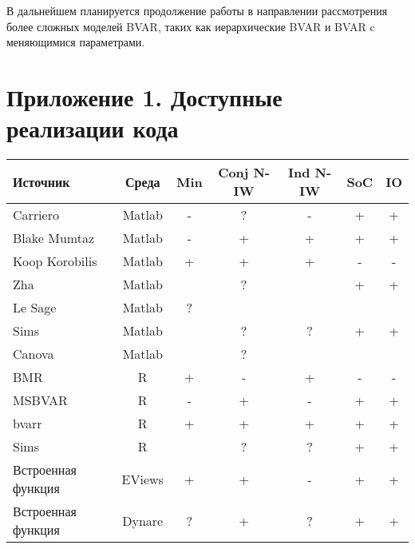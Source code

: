 \documentclass[11pt]{article} %
\begin{document}
В дальнейшем планируется продолжение работы в направлении рассмотрения более сложных моделей BVAR, таких как иерархические BVAR и BVAR c меняющимися параметрами.

\newpage
\printbibliography

\newpage


\section*{Приложение 1. Доступные реализации кода}

\begin{center}
\begin{tabular}{p{4cm}cccccc}
\toprule
Источник&  Среда&Min &  Conj N-IW & Ind N-IW & SoC &IO\\
\midrule
Carriero&Matlab&-&?&-&+&+ \\
Blake Mumtaz&Matlab&-&+&+&+&+ \\
Koop Korobilis&Matlab  & + & +  & + &- &- \\
Zha&Matlab&&?&&+&+\\
Le Sage&Matlab&?&&&&\\
Sims&Matlab&&?&?&+&+\\
Canova&Matlab&&?&&&\\
BMR&R& + & - & + & - & -  \\
MSBVAR&R & - & + & - & + & +  \\
bvarr&R  & + & + & + & + & +  \\
Sims&R&&?&?&+&+\\
Встроенная функция&EViews& + & + & - &+ &+ \\
Встроенная функция&Dynare& ? & +& ?& +&+  \\
\bottomrule
\end{tabular}
\end{center}
\end{document}
